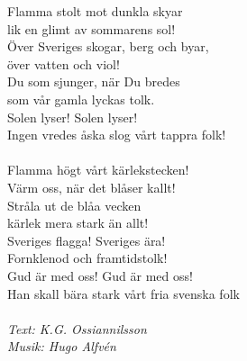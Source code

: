 \vspace{10pt}
Flamma stolt mot dunkla skyar\\
lik en glimt av sommarens sol!\\
Över Sveriges skogar, berg och byar,\\
över vatten och viol!\\
Du som sjunger, när Du bredes\\
som vår gamla lyckas tolk.\\
Solen lyser! Solen lyser!\\
Ingen vredes åska slog vårt tappra folk!\\
\\
Flamma högt vårt kärlekstecken!\\
Värm oss, när det blåser kallt!\\
Stråla ut de blåa vecken\\
kärlek mera stark än allt!\\
Sveriges flagga! Sveriges ära!\\
Fornklenod och framtidstolk!\\
Gud är med oss! Gud är med oss!\\
Han skall bära stark vårt fria svenska folk\\
\\
{\footnotesize\textit{Text: K.G. Ossiannilsson\\
Musik: Hugo Alfvén}}
